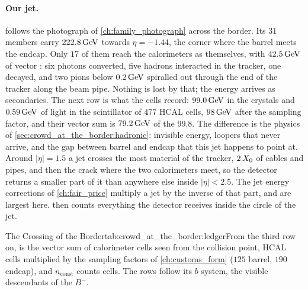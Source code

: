 \paragraph{Our jet.}
 follows the photograph of
\cref{ch:family_photograph} across the border. Its $31$ members carry
$222.8\,\mathrm{GeV}$ towards $\eta=-1.44$, the corner where the barrel meets the
endcap. Only $17$ of them reach the calorimeters as themselves,
with $42.5\,\mathrm{GeV}$ of vector \pt: six photons converted, five hadrons interacted in the tracker, one decayed, and two pions below $0.2\,\mathrm{GeV}$ spiralled out through the end of the tracker along the beam pipe. Nothing is lost
by that; the energy arrives as secondaries. The next row is what the cells
record: $99.0\,\mathrm{GeV}$ in the crystals and
$0.59\,\mathrm{GeV}$ of light in the scintillator of
$477$ HCAL cells, $98\,\mathrm{GeV}$ after the
sampling factor, and their vector sum is $79.2\,\mathrm{GeV}$ of the
$99.8$. The difference is the physics of
\cref{sec:crowd_at_the_border:hadronic}: invisible energy, loopers that
never arrive, and \textcolor{red!75!black}{the gap between barrel and
endcap that this jet happens to point at. Around $|\eta|=1.5$ a jet
crosses the most material of the tracker, $2\,X_0$ of cables and
pipes, and then the crack where the two calorimeters meet, so the detector
returns a smaller part of it than anywhere else inside $|\eta|<2.5$. The
jet energy corrections of \cref{ch:fair_price} multiply a jet by the
inverse of that part, and are largest here.}  then counts everything
the detector receives inside the circle of the jet.

\begin{ledgerboth}{The Crossing of the Border}{tab:crowd_at_the_border:ledger}{From
the third row on, \pt is the vector sum of calorimeter cells seen from the
collision point, HCAL cells multiplied by the sampling factors of
\cref{ch:customs_form} ($125$ barrel, $190$ endcap), and
$n_{\mathrm{const}}$ counts cells. The \CMSSW rows follow its $b$ system, the
visible descendants of the $B^-$.}
\end{ledgerboth}

